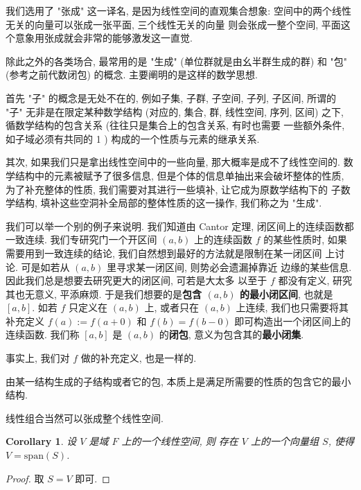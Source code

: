 \documentclass[UTF8]{book}
\newtheorem{corollary}{Corollary}[section]
\begin{document}
\begin{remark}
    我们选用了 "张成" 这一译名, 是因为线性空间的直观集合想象: 
    空间中的两个线性无关的向量可以张成一张平面, 三个线性无关的向量
    则会张成一整个空间, 平面这个意象用张成就会非常的能够激发这一直觉. 

    除此之外的各类场合, 最常用的是 "生成" (单位群就是由幺半群生成的群) 
    和 "包" (参考之前代数闭包) 的概念. 
    主要阐明的是这样的数学思想. 

    首先 "子" 的概念是无处不在的, 例如子集, 子群, 子空间, 子列, 子区间, 
    所谓的 "子" 无非是在限定某种数学结构 (对应的, 集合, 群, 线性空间, 
    序列, 区间) 
    之下, 循数学结构的包含关系 (往往只是集合上的包含关系, 有时也需要
    一些额外条件, 如子域必须有共同的 1 ) 构成的一个性质与元素的继承关系. 

    其次, 如果我们只是拿出线性空间中的一些向量, 那大概率是成不了线性空间的. 
    数学结构中的元素被赋予了很多信息, 但是个体的信息单抽出来会破坏整体的性质, 
    为了补充整体的性质, 我们需要对其进行一些填补, 让它成为原数学结构下的
    子数学结构, 填补这些空洞补全局部的整体性质的这一操作, 我们称之为 
    "生成". 

    我们可以举一个别的例子来说明. 我们知道由 Cantor 定理, 
    闭区间上的连续函数都一致连续. 我们专研究门一个开区间 
    $(a,b)$ 上的连续函数 $f$ 的某些性质时, 
    如果需要用到一致连续的结论, 我们自然想到最好的方法就是限制在某一闭区间
    上讨论. 可是如若从 $(a,b)$ 里寻求某一闭区间, 则势必会遗漏掉靠近
    边缘的某些信息. 因此我们总是想要去研究更大的闭区间, 可若是大太多
    以至于 $f$ 都没有定义, 研究其也无意义, 平添麻烦. 
    于是我们想要的是\textbf{包含 $(a,b)$ 的最小闭区间}, 
    也就是 $[a,b]$. 如若 $f$ 只定义在 $(a,b)$ 上, 
    或者只在 $(a,b)$ 上连续, 我们也只需要将其补充定义 $f(a):=f(a+0)$ 
    和 $f(b)=f(b-0)$ 即可构造出一个闭区间上的连续函数. 
    我们称 $[a,b]$ 是 $(a,b)$ 的\textbf{闭包}, 
    意义为包含其的\textbf{最小闭集}. 

    事实上, 我们对 $f$ 做的补充定义, 也是一样的. 

    由某一结构生成的子结构或者它的包, 
    本质上是满足所需要的性质的包含它的最小结构. 
\end{remark}

线性组合当然可以张成整个线性空间. 

\begin{corollary}
    设 $V$ 是域 $F$ 上的一个线性空间, 则
    存在 $V$ 上的一个向量组 $S$, 使得 $V=\mathrm{span}(S)$.
\end{corollary}

\begin{proof}
    取 $S=V$ 即可. 
\end{proof}
\end{document}
